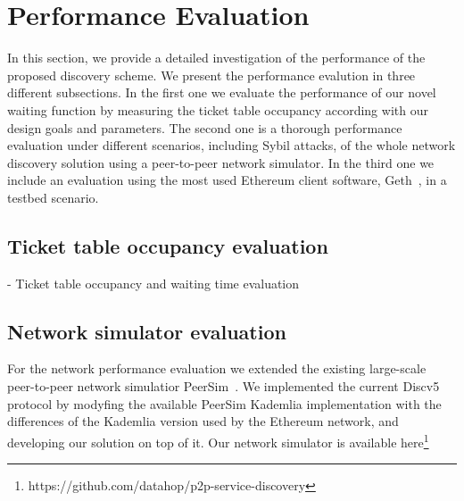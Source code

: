 
\section{Performance Evaluation}\label{sec:eval}

In  this  section,  we  provide  a  detailed  investigation  of  the performance of the proposed discovery scheme.
We present the performance evalution in three different subsections. 
In the first one we evaluate the performance of our novel waiting function by measuring the ticket table occupancy
according with our design goals and parameters.
The second one is a thorough performance evaluation under different scenarios, including Sybil attacks, of the whole network discovery solution using a peer-to-peer network simulator.
In the third one we include an evaluation using the most used Ethereum client software, Geth~\cite{go-ethereum}, in a testbed scenario.

\subsection{Ticket table occupancy evaluation}

- Ticket table occupancy  and waiting time evaluation

\subsection{Network simulator evaluation}



For the network performance evaluation we extended the existing 
large-scale peer-to-peer network simulatior PeerSim~\cite{p2p09-peersim}.
We implemented the current Discv5 protocol by modyfing the available PeerSim Kademlia implementation with the differences of the Kademlia version used by the Ethereum network, and developing our solution on top of it. Our network simulator is available here\footnote{https://github.com/datahop/p2p-service-discovery}

